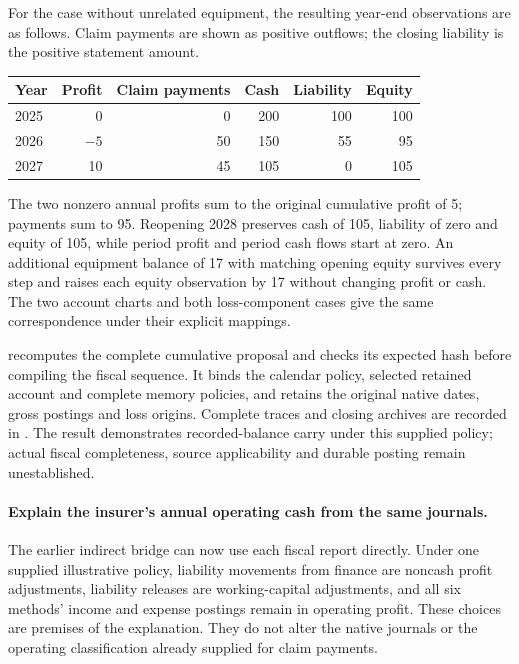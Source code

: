 For the case without unrelated equipment, the resulting year-end observations
are as follows. Claim payments are shown as positive outflows; the closing
liability is the positive statement amount.
\begin{center}\small
\begin{tabular}{lrrrrr}
\toprule
Year & Profit & Claim payments & Cash & Liability & Equity \\
\midrule
2025 & 0 & 0 & 200 & 100 & 100 \\
2026 & $-5$ & 50 & 150 & 55 & 95 \\
2027 & 10 & 45 & 105 & 0 & 105 \\
\bottomrule
\end{tabular}
\end{center}
The two nonzero annual profits sum to the original cumulative profit of 5;
payments sum to 95. Reopening 2028 preserves cash of 105, liability of zero
and equity of 105, while period profit and period cash flows start at zero.
An additional equipment balance of 17 with matching opening equity survives
every step and raises each equity observation by 17 without changing profit
or cash. The two account charts and both loss-component cases give the same
correspondence under their explicit mappings.

 recomputes the complete cumulative proposal and
checks its expected hash before compiling the fiscal sequence. It binds the
calendar policy, selected retained account and complete memory policies, and
retains the original native dates, gross postings and loss origins. Complete
traces and closing archives are recorded in
.
The result demonstrates recorded-balance carry under this supplied policy;
actual fiscal completeness, source applicability and durable posting remain
unestablished.


\paragraph{Explain the insurer's annual operating cash from the same journals.}
The earlier indirect bridge can now use each fiscal report directly. Under one
supplied illustrative policy, liability movements from finance are noncash
profit adjustments, liability releases are working-capital adjustments, and
all six methods' income and expense postings remain in operating profit.
These choices are premises of the explanation. They do not alter the native
journals or the operating classification already supplied for claim payments.

